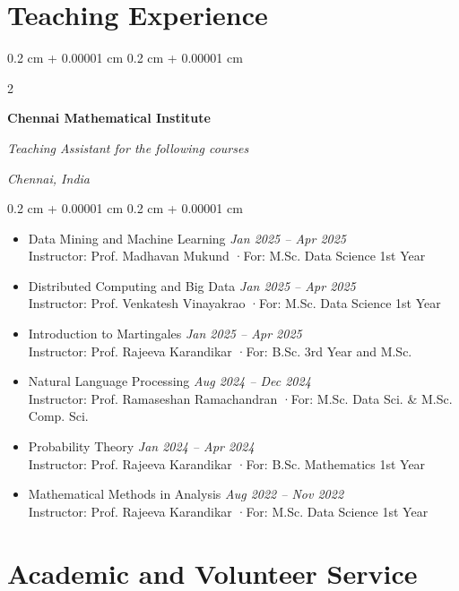 \documentclass[10pt, letterpaper]{article}
\newenvironment{highlights}{
    \begin{itemize}[
        topsep=0.10 cm,
        parsep=0.10 cm,
        partopsep=0pt,
        itemsep=0pt,
        leftmargin=0.4 cm + 10pt
    ]
}{
    \end{itemize}
} %
\newenvironment{onecolentry}{
    \begin{adjustwidth}{
        0.2 cm + 0.00001 cm
    }{
        0.2 cm + 0.00001 cm
    }
}{
    \end{adjustwidth}
} %
\newenvironment{twocolentry}[2][]{
    \onecolentry
    \def\secondColumn{#2}
    \setcolumnwidth{\fill, 6.5 cm}
    \begin{paracol}{2}
}{
    \switchcolumn \raggedleft \secondColumn
    \end{paracol}
    \endonecolentry
} %
\begin{document}
    

    \section{Teaching Experience}

    \begin{twocolentry}{
        \textit{Chennai, India}}
            \textbf{Chennai Mathematical Institute}

            \textit{Teaching Assistant for the following courses}
    \end{twocolentry}

    \begin{onecolentry}
        \begin{highlights}
            \item Data Mining and Machine Learning \hfill \textit{Jan 2025 – Apr 2025}\\
            {\small Instructor: Prof. Madhavan Mukund \quad·\quad For: M.Sc. Data Science 1st Year}
            \item Distributed Computing and Big Data \hfill \textit{Jan 2025 – Apr 2025}\\
            {\small Instructor: Prof. Venkatesh Vinayakrao \quad·\quad For: M.Sc. Data Science 1st Year}
            \item Introduction to Martingales \hfill \textit{Jan 2025 – Apr 2025}\\
            {\small Instructor: Prof. Rajeeva Karandikar \quad·\quad For: B.Sc. 3rd Year and M.Sc.}
            \item Natural Language Processing \hfill \textit{Aug 2024 – Dec 2024}\\
            {\small Instructor: Prof. Ramaseshan Ramachandran \quad·\quad For: M.Sc. Data Sci. \& M.Sc. Comp. Sci.}
            \item Probability Theory \hfill \textit{Jan 2024 – Apr 2024}\\
            {\small Instructor: Prof. Rajeeva Karandikar \quad·\quad For: B.Sc. Mathematics 1st Year}
            \item Mathematical Methods in Analysis \hfill \textit{Aug 2022 – Nov 2022}\\
            {\small Instructor: Prof. Rajeeva Karandikar \quad·\quad For: M.Sc. Data Science 1st Year}
        \end{highlights}
    \end{onecolentry}

    \section{Academic and Volunteer Service}
\end{document}
